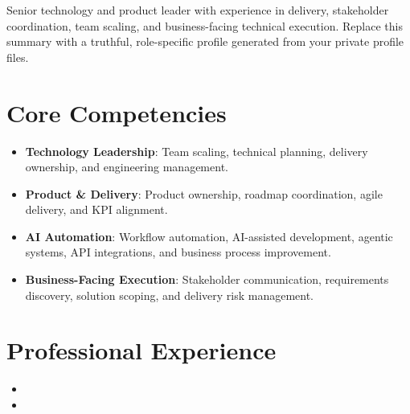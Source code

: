\documentclass[11pt,a4paper,sans]{moderncv}
\begin{document}
\makecvtitle

\vspace{6pt}
\small{Senior technology and product leader with experience in delivery, stakeholder coordination, team scaling, and business-facing technical execution. Replace this summary with a truthful, role-specific profile generated from your private profile files.}

\section{Core Competencies}
\vspace{1pt}
\begin{itemize}
\item \textbf{Technology Leadership}: Team scaling, technical planning, delivery ownership, and engineering management.
\item \textbf{Product \& Delivery}: Product ownership, roadmap coordination, agile delivery, and KPI alignment.
\item \textbf{AI Automation}: Workflow automation, AI-assisted development, agentic systems, API integrations, and business process improvement.
\item \textbf{Business-Facing Execution}: Stakeholder communication, requirements discovery, solution scoping, and delivery risk management.
\end{itemize}

\section{Professional Experience}
\vspace{3pt}
\begin{itemize}

\item{}

\vspace{3pt}

\item{}

\end{itemize}
\end{document}
